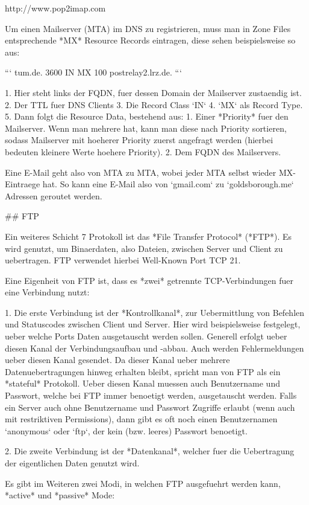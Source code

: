 http://www.pop2imap.com

Um einen Mailserver (MTA) im DNS zu registrieren, muss man in Zone Files entsprechende
*MX* Resource Records eintragen, diese sehen beispielsweise so aus:

```
tum.de. 3600 IN MX 100 postrelay2.lrz.de.
```

1. Hier steht links der FQDN, fuer dessen Domain der Mailserver zustaendig ist.
2. Der TTL fuer DNS Clients
3. Die Record Class `IN`
4. `MX` als Record Type.
5. Dann folgt die Resource Data, bestehend aus:
   1. Einer *Priority* fuer den Mailserver. Wenn man mehrere hat, kann man diese
      nach Priority sortieren, sodass Mailserver mit hoeherer Priority zuerst
      angefragt werden (hierbei bedeuten kleinere Werte hoehere Priority).
   2. Dem FQDN des Mailservers.

Eine E-Mail geht also von MTA zu MTA, wobei jeder MTA selbst wieder MX-Eintraege
hat. So kann eine E-Mail also von `gmail.com` zu `goldsborough.me` Adressen
geroutet werden.

## FTP

Ein weiteres Schicht 7 Protokoll ist das *File Transfer Protocol* (*FTP*). Es
wird genutzt, um Binaerdaten, also Dateien, zwischen Server und Client zu
uebertragen. FTP verwendet hierbei Well-Known Port TCP 21.

Eine Eigenheit von FTP ist, dass es *zwei* getrennte TCP-Verbindungen fuer eine
Verbindung nutzt:

1. Die erste Verbindung ist der *Kontrollkanal*, zur Uebermittlung von Befehlen
   und Statuscodes zwischen Client und Server. Hier wird beispielsweise
   festgelegt, ueber welche Ports Daten ausgetauscht werden sollen. Generell
   erfolgt ueber diesen Kanal der Verbindungsaufbau und -abbau. Auch werden
   Fehlermeldungen ueber diesen Kanal gesendet. Da dieser Kanal ueber mehrere
   Datenuebertragungen hinweg erhalten bleibt, spricht man von FTP als ein
   *stateful* Protokoll. Ueber diesen Kanal muessen auch Benutzername und
   Passwort, welche bei FTP immer benoetigt werden, ausgetauscht werden. Falls
   ein Server auch ohne Benutzername und Passwort Zugriffe erlaubt (wenn auch
   mit restriktiven Permissions), dann gibt es oft noch einen Benutzernamen
   `anonymous` oder `ftp`, der kein (bzw. leeres) Passwort benoetigt.

2. Die zweite Verbindung ist der *Datenkanal*, welcher fuer die Uebertragung der
   eigentlichen Daten genutzt wird.

Es gibt im Weiteren zwei Modi, in welchen FTP ausgefuehrt werden kann, *active*
und *passive* Mode:

